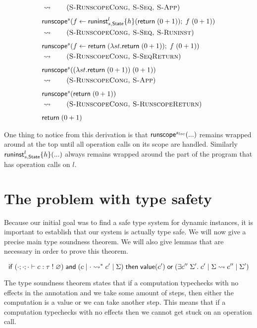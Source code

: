 {\begin{align*}
& \opsem{} \tag{\textsc{S-RunscopeCong, S-Seq, S-App}} \\
& \chandlec{s}{\cdo{f}{\chandlei{l}{s,\mathsf{State}}{h}{\creturn{(0 + 1)}}}{\capp{f}{(0 + 1)}}} \\
& \opsem{} \tag{\textsc{S-RunscopeCong, S-Seq, S-Runinst}} \\
& \chandlec{s}{\cdo{f}{\creturn (\vabs{st}{\creturn{(0 + 1)}})}{\capp{f}{(0 + 1)}}} \\
& \opsem{} \tag{\textsc{S-RunscopeCong, S-SeqReturn}} \\
& \chandlec{s}{\capp{(\vabs{st}{\creturn{(0 + 1)}})}{(0 + 1)}} \\
& \opsem{} \tag{\textsc{S-RunscopeCong, S-App}} \\
& \chandlec{s}{\creturn{(0 + 1)}} \\
& \opsem{} \tag{\textsc{S-RunscopeCong, S-RunscopeReturn}} \\
& \creturn{(0 + 1)}
\end{align*}

One thing to notice from this derivation is that $\mathsf{runscope}^{s_{loc}} ( ... )$ remains wrapped around at the top until all operation calls on its scope are handled. Similarly $\mathsf{runinst}^{l}_{s,\mathsf{State}} \{ h \} ( ... )$ always remains wrapped around the part of the program that has operation calls on $l$.

\section{The problem with type safety}
\label{sec:typesafety}

Because our initial goal was to find a safe type system for dynamic instances, it is important to establish that our system is actually type safe.
We will now give a precise main type soundness theorem.
We will also give lemmas that are necessary in order to prove this theorem.

\begin{theorem}
\[
	\mathsf{if}\;
		(\cdot;\cdot;\cdot \vdash c : \tau \; ! \; \varnothing)
		\;\mathsf{and}\;
		(c \;|\; \cdot \rightsquigarrow^* c' \;|\; \Sigma)
	\;\mathsf{then}\;
		\mathsf{value}(c')
		\;\mathsf{or}\;
		(\exists c'' \; \Sigma'.\; c' \;|\; \Sigma \rightsquigarrow c'' \;|\; \Sigma')
\]
\end{theorem}

The type soundness theorem states that if a computation typechecks with no effects in the annotation and we take some amount of steps, then either the computation is a value or we can take another step.
This means that if a computation typechecks with no effects then we cannot get stuck on an operation call.

}
